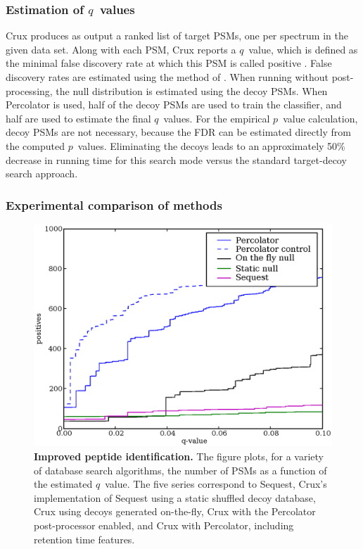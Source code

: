 \documentclass[12pt]{article}
\begin{document}
\subsubsection{Estimation of $q$~values}
\label{section:q-value}

Crux produces as output a ranked list of target PSMs, one per spectrum
in the given data set.  Along with each PSM, Crux reports a $q$~value,
which is defined as the minimal false discovery rate at which this PSM
is called positive \cite{storey:statistical}.  False discovery rates
are estimated using the method of \cite{benjamini:controlling}.  When
running without post-processing, the null distribution is estimated
using the decoy PSMs.  When Percolator is used, half of the decoy PSMs
are used to train the classifier, and half are used to estimate the
final $q$~values.  For the empirical $p$~value calculation, decoy PSMs
are not necessary, because the FDR can be estimated directly from the
computed $p$~values.  Eliminating the decoys leads to an approximately
50\% decrease in running time for this search mode versus the standard
target-decoy search approach.

\subsubsection{Experimental comparison of methods}
\label{section:experimental}

\begin{figure}
\centering
\includegraphics[width=5in]{./Images/q-value.eps}
\caption{{\bf Improved peptide identification.}  The figure plots, for
  a variety of database search algorithms, the number of PSMs as a
  function of the estimated $q$~value.  The five series correspond to
  {\sc Sequest}, Crux's implementation of {\sc Sequest} using a static 
  shuffled decoy
  database, Crux using decoys generated on-the-fly, Crux with the
  Percolator post-processor enabled, and Crux with Percolator,
  including retention time features.
  \label{figure:pq-plot}}
\end{figure}
\end{document}
